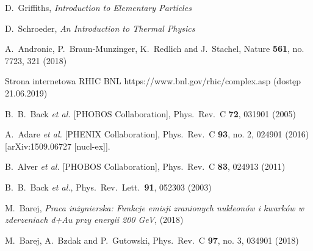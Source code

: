 \documentclass[a4paper,12pt]{article}
\begin{document}
\newpage
\begin{thebibliography}{9}
 D.~Griffiths, \textit{Introduction to Elementary Particles}

 D.~Schroeder, \textit{An Introduction to Thermal Physics}

  A.~Andronic, P.~Braun-Munzinger, K.~Redlich and J.~Stachel,
  Nature {\bf 561}, no. 7723, 321 (2018)

 Strona internetowa RHIC BNL https://www.bnl.gov/rhic/complex.asp (dostęp 21.06.2019)

  B.~B.~Back {\it et al.} [PHOBOS Collaboration],
  Phys.\ Rev.\ C {\bf 72}, 031901 (2005)

  A.~Adare {\it et al.} [PHENIX Collaboration],
  Phys.\ Rev.\ C {\bf 93}, no. 2, 024901 (2016)
  [arXiv:1509.06727 [nucl-ex]].

  B.~Alver {\it et al.} [PHOBOS Collaboration],
  Phys.\ Rev.\ C {\bf 83}, 024913 (2011)

  B.~B.~Back {\it et al.},
  Phys.\ Rev.\ Lett.\  {\bf 91}, 052303 (2003)

  M.~Barej, \textit{Praca inżynierska: Funkcje emisji zranionych nukleonów i kwarków w zderzeniach d+Au przy energii 200 GeV}, (2018)

  M.~Barej, A.~Bzdak and P.~Gutowski,
  Phys.\ Rev.\ C {\bf 97}, no. 3, 034901 (2018)


\end{thebibliography}
\end{document}
